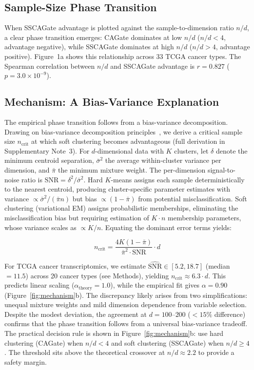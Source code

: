 \documentclass[12pt,a4paper]{article}
\begin{document}
\subsection{Sample-Size Phase Transition}

When SSCAGate advantage is plotted against the sample-to-dimension ratio $n/d$, a clear phase transition emerges: CAGate dominates at low $n/d$ ($n/d < 4$, advantage negative), while SSCAGate dominates at high $n/d$ ($n/d > 4$, advantage positive). Figure~1a shows this relationship across 33 TCGA cancer types. The Spearman correlation between $n/d$ and SSCAGate advantage is $r = 0.827$ ($p = 3.0 \times 10^{-9}$).



\subsection{Mechanism: A Bias-Variance Explanation}

The empirical phase transition follows from a bias-variance decomposition. Drawing on bias-variance decomposition principles~\cite{advani2016statmech}, we derive a critical sample size $n_{\text{crit}}$ at which soft clustering becomes advantageous (full derivation in Supplementary Note~3). For $d$-dimensional data with $K$ clusters, let $\delta$ denote the minimum centroid separation, $\bar{\sigma}^2$ the average within-cluster variance per dimension, and $\bar{\pi}$ the minimum mixture weight. The per-dimension signal-to-noise ratio is $\text{SNR} = \delta^2 / \bar{\sigma}^2$. Hard $K$-means assigns each sample deterministically to the nearest centroid, producing cluster-specific parameter estimates with variance $\propto \bar{\sigma}^2 / (\bar{\pi} n)$ but bias $\propto (1 - \bar{\pi})$ from potential misclassification. Soft clustering (variational EM) assigns probabilistic memberships, eliminating the misclassification bias but requiring estimation of $K \cdot n$ membership parameters, whose variance scales as $\propto K / n$. Equating the dominant error terms yields:

\begin{equation}
\boxed{n_{\text{crit}} = \frac{4K(1 - \bar{\pi})}{\bar{\pi}^2 \cdot \text{SNR}} \cdot d}
\label{eq:ncrit}
\end{equation}

For TCGA cancer transcriptomics, we estimate $\widehat{\text{SNR}} \in [5.2, 18.7]$ (median $= 11.5$) across 20 cancer types (see Methods), yielding $n_{\text{crit}} \approx 6.3 \cdot d$. This predicts linear scaling ($\alpha_{\text{theory}} = 1.0$), while the empirical fit gives $\alpha = 0.90$ (Figure~\ref{fig:mechanism}b). The discrepancy likely arises from two simplifications: unequal mixture weights and mild dimension dependence from variable selection. Despite the modest deviation, the agreement at $d = 100$--$200$ ($< 15\%$ difference) confirms that the phase transition follows from a universal bias-variance tradeoff. The practical decision rule is shown in Figure~\ref{fig:mechanism}b: use hard clustering (CAGate) when $n/d < 4$ and soft clustering (SSCAGate) when $n/d \ge 4$. The threshold sits above the theoretical crossover at $n/d \approx 2.2$ to provide a safety margin.
\end{document}
